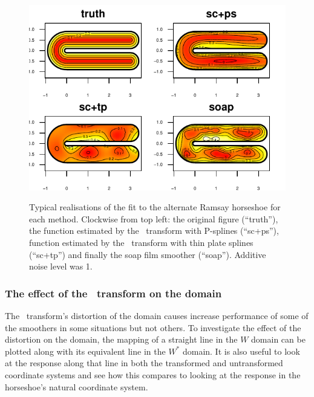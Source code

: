 \begin{figure}
\centering
\includegraphics[width=6in]{sc/figs/altramsaycomp.pdf}\\
\caption{Typical realisations of the fit to the alternate Ramsay horseshoe for each method. Clockwise from top left: the original figure (``truth''), the function estimated by the \sch\ transform with P-splines (``sc+ps''), function estimated by the \sch\ transform with thin plate splines (``sc+tp'') and finally the soap film smoother (``soap''). Additive noise level was 1.}
\label{altramsaycomp}
\end{figure}


\subsubsection{The effect of the \sch\ transform on the domain}

The \sch\ transform's distortion of the domain causes increase performance of some of the smoothers in some situations but not others. To investigate the effect of the distortion on the domain, the mapping of a straight line in the $W$ domain can be plotted along with its equivalent line in the $W^*$ domain. It is also useful to look at the response along that line in both the transformed and untransformed coordinate systems and see how this compares to looking at the response in the horseshoe's natural coordinate system.

